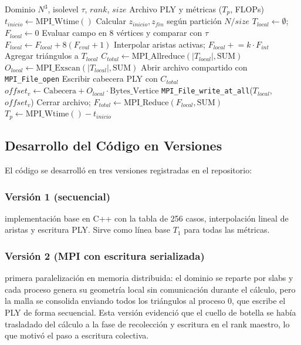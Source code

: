 \documentclass[conference]{IEEEtran}
\begin{document}
\begin{algorithm}[H]
\caption{Marching Cubes Paralelo (MPI + MPI-IO)}
\label{alg:mpi}
\begin{algorithmic}[1]
\REQUIRE Dominio $N^3$, isolevel $\tau$, $rank$, $size$
\ENSURE Archivo PLY y métricas ($T_p$, FLOPs)
\STATE $t_{inicio} \leftarrow \text{MPI\_Wtime}()$
\STATE Calcular $z_{inicio}, z_{fin}$ según partición $N/size$
\STATE $T_{local} \leftarrow \emptyset$; $F_{local} \leftarrow 0$
            \STATE Evaluar campo en 8 vértices y comparar con $\tau$
            \STATE $F_{local} \leftarrow F_{local} + 8(F_{eval}+1)$
                \STATE Interpolar aristas activas; $F_{local} \mathrel{+}= k \cdot F_{int}$
                \STATE Agregar triángulos a $T_{local}$
            \ENDIF
        \ENDFOR
    \ENDFOR
\ENDFOR
\STATE $C_{total} \leftarrow \text{MPI\_Allreduce}(|T_{local}|, \text{SUM})$
\STATE $O_{local} \leftarrow \text{MPI\_Exscan}(|T_{local}|, \text{SUM})$
\STATE Abrir archivo compartido con \texttt{MPI\_File\_open}
 \STATE Escribir cabecera PLY con $C_{total}$ \ENDIF
\STATE $offset_v \leftarrow \text{Cabecera} + O_{local} \cdot \text{Bytes\_Vertice}$
\STATE \texttt{MPI\_File\_write\_at\_all}($T_{local}$, $offset_v$)
\STATE Cerrar archivo; $F_{total} \leftarrow \text{MPI\_Reduce}(F_{local}, \text{SUM})$
\STATE $T_p \leftarrow \text{MPI\_Wtime}() - t_{inicio}$
\end{algorithmic}
\end{algorithm}

\subsection{Desarrollo del Código en Versiones}
El código se desarrolló en tres versiones registradas en el repositorio:

\subsubsection{Versión 1 (secuencial)} implementación base en C++ con la tabla de 256 casos, interpolación lineal de aristas y escritura PLY. Sirve como línea base $T_1$ para todas las métricas.

\subsubsection{Versión 2 (MPI con escritura serializada)} primera paralelización en memoria distribuida: el dominio se reparte por slabs y cada proceso genera su geometría local sin comunicación durante el cálculo, pero la malla se consolida enviando todos los triángulos al proceso 0, que escribe el PLY de forma secuencial. Esta versión evidenció que el cuello de botella se había trasladado del cálculo a la fase de recolección y escritura en el rank maestro, lo que motivó el paso a escritura colectiva.
\end{document}
